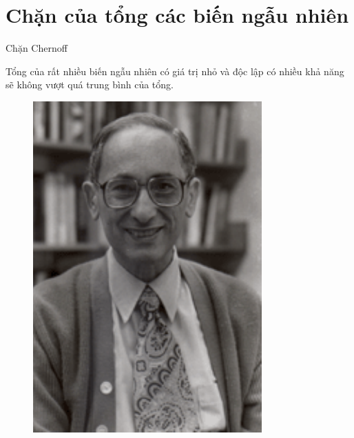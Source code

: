 \section{Chặn của tổng các biến ngẫu nhiên}
\begin{frame}{Chặn Chernoff}
	\begin{minipage}[c]{0.6\textwidth}
		Tổng của rất nhiều biến ngẫu nhiên có giá trị nhỏ và độc lập có nhiều khả năng sẽ  không vượt quá trung bình của tổng. 
	\end{minipage}\qquad 
		\begin{minipage}[c]{0.3\textwidth}
			\begin{figure}[h]
			  \centering
			    \includegraphics[width=\textwidth]{Chernoff.pdf}
			\end{figure}
		
		\end{minipage}
	\end{frame}
